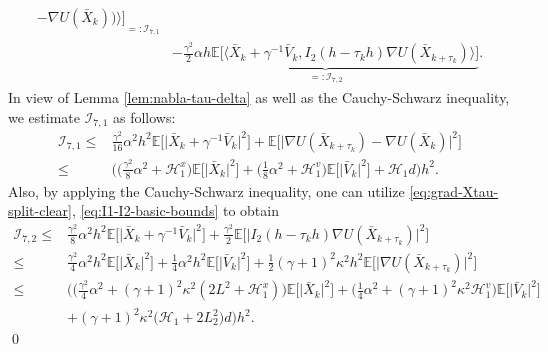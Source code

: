 \documentclass[12pt]{article}
\numberwithin{equation}{section}
\renewenvironment{proof}%
  {\begin{trivlist}%
   \item[]\ignorespaces}%
  {\qed\end{trivlist}}
\newcommand{\E}{\mathbb{E}}
\newcommand{\X}{\bar{X}}
\newcommand{\V}{\bar{V}}
\renewcommand{\H}{\mathcal{H}}
\begin{document}
\begin{proof}
\begin{equation}
\begin{aligned}
{-
\nabla U(\bar{X}_{k})
\big)
\Big\rangle
\Big]
}_{=:\mathcal  I_{7,1}}
\\    &
\underbrace{
-
\tfrac{\gamma^2}{2}
\alpha  h
\mathbb{E}
\Big[
\Big\langle
\bar{X}_k
+
\gamma^{-1}\bar{V}_k,
I_{2} (h-\tau_kh)
\nabla U(\bar{X}_{k+\tau_k})
\Big\rangle
\Big]
}_{=:\mathcal  I_{7,2}}.
\end{aligned}
\end{equation}
%
In view of Lemma \ref{lem:nabla-tau-delta} as well as the Cauchy-Schwarz inequality, we estimate $\mathcal  I_{7,1}$ as follows:
\begin{equation}
\label{eq:mathcal-I-71}
\begin{aligned}
\mathcal  I_{7,1}
\leq     &
\tfrac{\gamma^2}{16}
 \alpha^2 
h^2
\E
\Big[
\big|
\X_k+\gamma^{-1}\V_k
\big|^2
\Big]
+
\E
\Big[
\big|
\nabla U (\X_{k+\tau_k})
-
\nabla U (\X_k)
\big|^2
\Big]
\\   
\leq    &
\Big(
\big(
\tfrac{\gamma^2 }{8}
\alpha^2
+
\H^x_1
\big)
\E
\Big[
\big|
\X_k
\big|^2
\Big]
+
\big(
\tfrac{1}{8}
\alpha^2
+
\H^v_1
\big)
\E
\Big[
\big|
\V_k
\big|^2
\Big]
+
\H_1
d 
\Big)
h^2.
\end{aligned}
\end{equation}
Also, by applying the Cauchy-Schwarz inequality, one can utilize \eqref{eq:grad-Xtau-split-clear}, \eqref{eq:I1-I2-basic-bounds} to obtain 
\begin{equation}
\label{eq:mathcal-I-72}
\begin{aligned}
\mathcal  I_{7,2}
\leq     &
\tfrac{\gamma^2}{8}
\alpha^2  h^2
\E
\Big[
\big|
\X_k+\gamma^{-1}\V_k
\big|^2
\Big]
+
\tfrac{\gamma^2}{2}
\mathbb{E}
\Big[
\big|
I_{2} (h-\tau_kh)
\nabla U(\bar{X}_{k+\tau_k})
\big|^2
\Big]
\\  
\leq    &
\tfrac{\gamma^2}{4}
\alpha^2  h^2 
\E
\Big[
\big|
\X_k
\big|^2
\Big]
+
\tfrac{1}{4}
\alpha^2  h^2 
\E
\Big[
\big|
\V_k
\big|^2
\Big]
+
\tfrac{1}{2}
(\gamma +  1)^2 \kappa^2  h^2
\mathbb{E}
\Big[
\big|
\nabla U(\bar{X}_{k+\tau_k})
\big|^2
\Big]
\\   
\leq    &
\Big(
\big(
\tfrac{\gamma^2}{4}
\alpha^2
+
(\gamma +  1)^2 \kappa^2 
(2 L^2
+
\H^{x}_1)
\big)
\mathbb{E}
\Big[\big|
\bar{X}_k
\big|^2\Big]
+
\big(
\tfrac{1}{4}
\alpha^2
+
(\gamma +  1)^2 \kappa^2 
\H^{v}_1
\big)
\mathbb{E}
\Big[\big|
\bar{V}_k
\big|^2\Big]
\\   &
+
(\gamma +  1)^2 \kappa^2
\big( 
\H_1  +  
2 L_2^2 
\big)
d
\Big)  
h^2.
\end{aligned}

\end{equation}
\end{proof}
\end{document}
